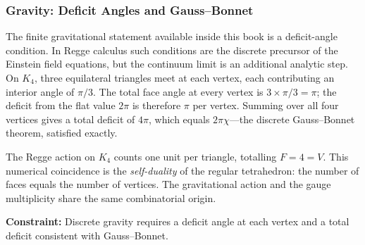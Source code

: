 \documentclass[11pt,a4paper]{book}
\begin{document}

\subsubsection*{Gravity: Deficit Angles and Gauss--Bonnet}

The finite gravitational statement available inside this book is a deficit-angle
condition.  In Regge calculus such conditions are the discrete precursor of the
Einstein field equations, but the continuum limit is an additional analytic step.
On $K_4$, three equilateral triangles meet at each vertex,
each contributing an interior angle of $\pi/3$.  The total face angle
at every vertex is $3 \times \pi/3 = \pi$; the deficit from the flat
value $2\pi$ is therefore $\pi$ per vertex.  Summing over all four vertices
gives a total deficit of $4\pi$, which equals $2\pi\chi$---the discrete
Gauss--Bonnet theorem, satisfied exactly.

The Regge action on $K_4$ counts one unit per triangle, totalling
$F = 4 = V$.  This numerical coincidence is the \emph{self-duality}
of the regular tetrahedron: the number of faces equals the number of
vertices.  The gravitational action and the gauge multiplicity share
the same combinatorial origin.

\textbf{Constraint:}
Discrete gravity requires a deficit angle at each vertex and a total
deficit consistent with Gauss--Bonnet.
\end{document}
